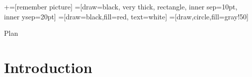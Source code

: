 \usetikzlibrary{positioning}
\usetikzlibrary{snakes}
\usetikzlibrary{calc}
\usetikzlibrary{arrows}
\usetikzlibrary{decorations.markings}
\usetikzlibrary{shapes.misc}
\usetikzlibrary{matrix,shapes,arrows,fit,tikzmark}
\usetikzlibrary{shapes}
\newcommand\marktopleft[1]{%
    \tikz[overlay,remember picture] 
        \node (marker-#1-a) at (-.3em,.3em) {};%
}
\newcommand\markbottomright[2]{%
    \tikz[overlay,remember picture] 
        \node (marker-#1-b) at (0em,0em) {};%
}
+=[remember picture] 
 =[draw=black, very thick, rectangle, inner sep=10pt, inner ysep=20pt]
 =[draw=black,fill=red, text=white]
=[draw,circle,fill=gray!50]



\begin{frame}
\titlepage
\end{frame}
\begin{frame}{Plan}
 \tableofcontents
    \end{frame}


\section{Introduction}
\frame{\sectionpage}

